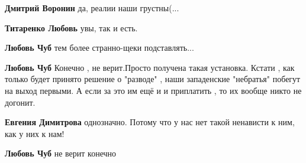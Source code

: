 \begin{itemize}
\begin{itemize}
 
\textbf{Дмитрий Воронин} да, реалии наши грустны(...

 
\textbf{Титаренко Любовь} увы, так и есть.

 
\textbf{Любовь Чуб} тем более странно-щеки подставлять...

 
\textbf{Любовь Чуб} Конечно , не верит.Просто получена такая установка. Кстати
, как только будет принято решение о "разводе" , наши западенские "небратья"
побегут на выход первыми. А если за это им ещё и и приплатить , то их вообще
никто не догонит.

 
\textbf{Евгения Димитрова} однозначно. Потому что у нас нет такой ненависти к ним, как у них к нам!

 
\textbf{Любовь Чуб} не верит конечно
\end{itemize}


\end{itemize}
